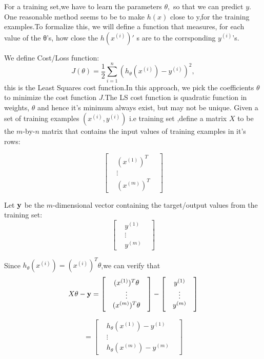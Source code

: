 \documentclass[12pt]{article}
\begin{document}
For a training set,we have to  learn the parameters $\theta,$ so that we can predict $y$. One reasonable method seems to be to make $h(x)$ close to y,for the training examples.To formalize this, we will define a function that measures, for each value of the θ’s, how close the $h(x^{(i)})'$ s are to the corrsponding $y^{(i)}$'s.

We  define Cost/Loss function: $$J(\theta)=\frac{1}{2}\sum_{i=1}^{n}(h_{\theta}(x^{(i)})-y^{(i)})^{2},$$this is the Least Squares cost function.In this approach, we pick the coefficients $\theta$ to minimize the cost function $J$.The LS cost function is quadratic function in weights, $\theta$ and hence it's minimum always exist, but may not be unique.
Given a set of training examples $(x^{(i)},y^{(i)})$ i.e training set ,define a matrix $X$ to be the $m$-by-$n$ matrix  that contains the input values of training examples in it's rows:  

 $$ \begin{bmatrix} 
  & {(x^{(1)})^{T}} &  \\
  & \vdots & \\
  &   (x^{(m)})^{T}     &  
  \end{bmatrix} $$
 
 
Let $ \textbf y$ be the $m$-dimensional vector containing the target/output values from the training set:
 $$\begin{bmatrix} 
 & y^{(1)} &  \\
 & \vdots & \\
 &   y^{(m)}     &  
 \end{bmatrix}$$
 
 
Since $h_{\theta}(x^{(i)})=(x^{(i)})^{T}\theta$,we can verify that
 $$X \theta - \textbf y = \begin{bmatrix} 
 & {(x^{(1)})^{T}}\theta &  \\
 & \vdots & \\
 &   (x^{(m)})^{T} \theta    &  
 \end{bmatrix} - \begin{bmatrix} 
 & y^{(1)} &  \\
 & \vdots & \\
 &   y^{(m)}     &  
 \end{bmatrix}$$
 
 $$=\begin{bmatrix} 
 & h_{\theta}(x^{(1)})-y^{(1)} &  \\
 & \vdots & \\
 &  h_{\theta}(x^{(m)})- y^{(m)}     &  
 \end{bmatrix}$$
 
\end{document}
